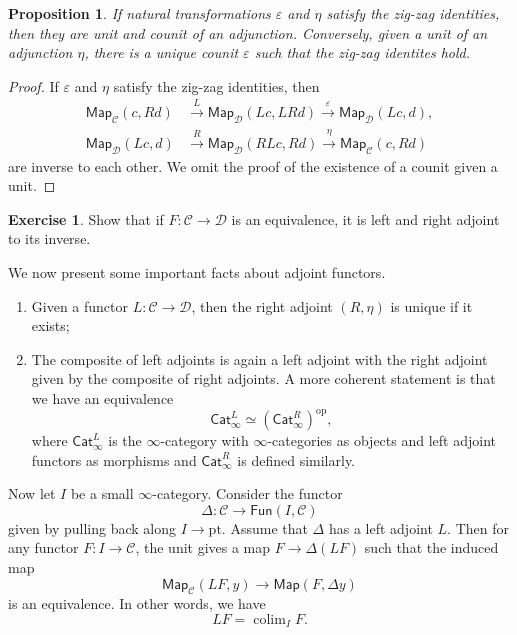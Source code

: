 \documentclass[10pt, oneside]{memoir}
\newtheorem{prop}[thm]{Proposition}
\theoremstyle{definition}
\newtheorem{exer}[thm]{Exercise}
\theoremstyle{remark}
\theoremstyle{plain}
\theoremstyle{definition}
\theoremstyle{remark}
\newcommand{\ep}{\varepsilon}
\newcommand{\mc}[1]{\mathcal{#1}}
\newcommand{\mr}[1]{\mathrm{#1}}
\newcommand{\ms}[1]{\mathsf{#1}}
\newcommand{\1}{\mathbf{1}}
\newcommand{\2}{\mathbf{2}}
\newcommand{\3}{\mathbf{3}}
\DeclareMathOperator{\op}{op}
\DeclareMathOperator*{\colim}{colim}
\begin{document}
\begin{prop}
    If natural transformations \(\ep \) and \(\eta \) satisfy the zig-zag identities, then they are unit and counit of an adjunction. Conversely, given a unit of an adjunction \(\eta \), there is a unique counit \(\ep \) such that the zig-zag identites hold.
\end{prop}

\begin{proof}
    If \(\ep \) and \(\eta \) satisfy the zig-zag identities, then
    \begin{align*}
        \ms{Map}_{\mc{C}}(c, Rd) &\xrightarrow{L} \ms{Map}_{\mc{D}}(Lc, LRd) \xrightarrow{\ep} \ms{Map}_{\mc{D}}(Lc, d), \\
        \ms{Map}_{\mc{D}}(Lc, d) &\xrightarrow{R} \ms{Map}_{\mc{D}}(RLc, Rd) \xrightarrow{\eta} \ms{Map}_{\mc{C}}(c, Rd)
    \end{align*}
    are inverse to each other. We omit the proof of the existence of a counit given a unit.
\end{proof}

\begin{exer}
    Show that if \(F \colon \mc{C} \to \mc{D} \) is an equivalence, it is left and right adjoint to its inverse.
\end{exer}

We now present some important facts about adjoint functors.
\begin{enumerate}
    \item Given a functor \(L \colon \mc{C} \to \mc{D} \), then the right adjoint \((R, \eta) \) is unique if it exists;
    \item The composite of left adjoints is again a left adjoint with the right adjoint given by the composite of right adjoints. A more coherent statement is that we have an equivalence
    \[ \ms{Cat}_{\infty}^L \simeq (\ms{Cat}_{\infty}^R)^{\op}, \]
    where \(\ms{Cat}_{\infty}^L \) is the \(\infty \)-category with \(\infty \)-categories as objects and left adjoint functors as morphisms and \(\ms{Cat}_{\infty}^R \) is defined similarly.
\end{enumerate}

Now let \(I \) be a small \(\infty \)-category. Consider the functor
\[ \Delta \colon \mc{C} \to \ms{Fun}(I, \mc{C}) \]
given by pulling back along \(I \to \mr{pt} \). Assume that \(\Delta \) has a left adjoint \(L \). Then for any functor \(F \colon I \to \mc{C} \), the unit gives a map \(F \to \Delta(LF) \)
such that the induced map
\[ \ms{Map}_{\mc{C}}(LF, y) \to \ms{Map}(F, \Delta y) \]
is an equivalence. In other words, we have
\[ LF = \colim_I F. \]
\end{document}
